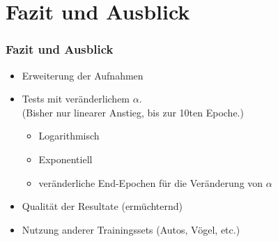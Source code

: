 \documentclass{beamer}
\begin{document}
\section{Fazit und Ausblick}
\begin{frame}
\frametitle{Fazit und Ausblick}
\begin{itemize}
    \item Erweiterung der Aufnahmen
    \item Tests mit veränderlichem $\alpha$. \\
    \small{(Bisher nur linearer Anstieg, bis zur 10ten Epoche.)}
    \begin{itemize}
        \item Logarithmisch
        \item Exponentiell
        \item veränderliche End-Epochen für die Veränderung von $\alpha$
    \end{itemize}
    \item Qualität der Resultate (ermüchternd)
    \item Nutzung anderer Trainingssets (Autos, Vögel, etc.)
\end{itemize}
\end{frame}
\end{document}
